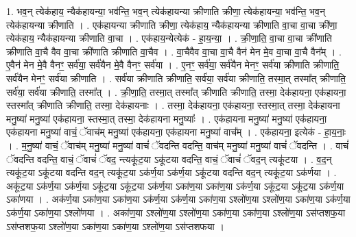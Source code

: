\documentclass[17pt]{extarticle}
\begin{document}
1. भव॒न् त्येक॑हाय॒ न्यैक॑हायन्या॒ भव॑न्ति॒ भव॒न् त्येक॑हायन्या क्रीणाति क्रीणा॒ त्येक॑हायन्या॒ भव॑न्ति॒ भव॒न् त्येक॑हायन्या क्रीणाति । . एक॑हायन्या क्रीणाति क्रीणा॒ त्येक॑हाय॒ न्यैक॑हायन्या क्रीणाति वा॒चा वा॒चा क्री॑णा॒ त्येक॑हाय॒ न्यैक॑हायन्या क्रीणाति वा॒चा । . एक॑हाय॒न्येत्येक॑ - हा॒य॒न्या॒ । . क्री॒णा॒ति॒ वा॒चा वा॒चा क्री॑णाति क्रीणाति वा॒चै वैव वा॒चा क्री॑णाति क्रीणाति वा॒चैव । . वा॒चैवैव वा॒चा वा॒चै वैन॑ मेन मे॒व वा॒चा वा॒चै वैन᳚म् । . ए॒वैन॑ मेन मे॒वै वैनꣳ॒॒ सर्व॑या॒ सर्व॑यैन मे॒वै वैनꣳ॒॒ सर्व॑या । . ए॒नꣳ॒॒ सर्व॑या॒ सर्व॑यैन मेनꣳ॒॒ सर्व॑या क्रीणाति क्रीणाति॒ सर्व॑यैन मेनꣳ॒॒ सर्व॑या क्रीणाति । . सर्व॑या क्रीणाति क्रीणाति॒ सर्व॑या॒ सर्व॑या क्रीणाति॒ तस्मा॒त् तस्मा᳚त् क्रीणाति॒ सर्व॑या॒ सर्व॑या क्रीणाति॒ तस्मा᳚त् । . क्री॒णा॒ति॒ तस्मा॒त् तस्मा᳚त् क्रीणाति क्रीणाति॒ तस्मा॒ देक॑हायना॒ एक॑हायना॒ स्तस्मा᳚त् क्रीणाति क्रीणाति॒ तस्मा॒ देक॑हायनाः । . तस्मा॒ देक॑हायना॒ एक॑हायना॒ स्तस्मा॒त् तस्मा॒ देक॑हायना मनु॒ष्या॑ मनु॒ष्या॑ एक॑हायना॒ स्तस्मा॒त् तस्मा॒ देक॑हायना मनु॒ष्याः᳚ । . एक॑हायना मनु॒ष्या॑ मनु॒ष्या॑ एक॑हायना॒ एक॑हायना मनु॒ष्या॑ वाचं॒ ॅवाच॑म् मनु॒ष्या॑ एक॑हायना॒ एक॑हायना मनु॒ष्या॑ वाच᳚म् । . एक॑हायना॒ इत्येक॑ - हा॒य॒नाः॒ । . म॒नु॒ष्या॑ वाचं॒ ॅवाच॑म् मनु॒ष्या॑ मनु॒ष्या॑ वाचं॑ ॅवदन्ति वदन्ति॒ वाच॑म् मनु॒ष्या॑ मनु॒ष्या॑ वाचं॑ ॅवदन्ति । . वाचं॑ ॅवदन्ति वदन्ति॒ वाचं॒ ॅवाचं॑ ॅवद॒ न्त्यकू॑ट॒या ऽकू॑टया वदन्ति॒ वाचं॒ ॅवाचं॑ ॅवद॒न् त्यकू॑टया । . व॒द॒न् त्यकू॑ट॒या ऽकू॑टया वदन्ति वद॒न् त्यकू॑ट॒या ऽक॑र्ण॒या ऽक॑र्ण॒या ऽकू॑टया वदन्ति वद॒न् त्यकू॑ट॒या ऽक॑र्णया । . अकू॑ट॒या ऽक॑र्ण॒या ऽक॑र्ण॒या ऽकू॑ट॒या ऽकू॑ट॒या ऽक॑र्ण॒या ऽका॑ण॒या ऽका॑ण॒या ऽक॑र्ण॒या ऽकू॑ट॒या ऽकू॑ट॒या ऽक॑र्ण॒या ऽका॑णया । . अक॑र्ण॒या ऽका॑ण॒या ऽका॑ण॒या ऽक॑र्ण॒या ऽक॑र्ण॒या ऽका॑ण॒या ऽश्लो॑ण॒या ऽश्लो॑ण॒या ऽका॑ण॒या ऽक॑र्ण॒या ऽक॑र्ण॒या ऽका॑ण॒या ऽश्लो॑णया । . अका॑ण॒या ऽश्लो॑ण॒या ऽश्लो॑ण॒या ऽका॑ण॒या ऽका॑ण॒या ऽश्लो॑ण॒या ऽस॑प्तशफ॒या ऽस॑प्तशफ॒या ऽश्लो॑ण॒या ऽका॑ण॒या ऽका॑ण॒या ऽश्लो॑ण॒या ऽस॑प्तशफया । \newline
\end{document}
